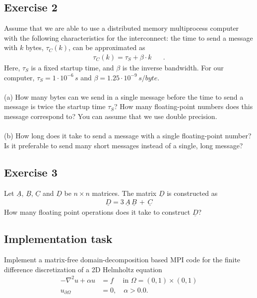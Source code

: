 \documentclass[11pt]{article}
\begin{document}
\clearpage
\subsection*{Exercise 2}

Assume that we are able to use a distributed memory multiprocess computer with the 
following characteristics for the interconnect: the time to send a
message with $k$ bytes, $\tau_C(k)$, can be approximated as 
\begin{eqnarray*}
\tau_C(k) = \tau_S + \beta \cdot k \,\,\,\,\,\,\,\,\,\, .
\end{eqnarray*}
Here, $\tau_S$ is a fixed startup time, and $\beta$ is the inverse bandwidth.
For our computer, $\tau_S = 1\cdot 10^{-6} \,s$ and $\beta = 1.25\cdot  10^{-9}\, s/byte$.\\
\\
(a) How many bytes can we send in a single message before the time to send a message 
is twice the startup time $\tau_S$? How many floating-point numbers does this 
message correspond to? You can assume that we use double precision.\\
\\
(b) How long does it take to send a message with a single floating-point number?
Is it preferable to send many short messages instead of a single, long message? 

\subsection*{Exercise 3}

Let $\underline{A}$, $\underline{B}$, $\underline{C}$ and $\underline{D}$ be $n\times n$ matrices. 
The matrix $\underline{D}$ is constructed as 
\begin{eqnarray*}
\underline{D} = 3\,\underline{A}\,\underline{B} \,+\, \underline{C}
\end{eqnarray*}
How many floating point operations does it take to construct $\underline{D}$?

\subsection*{Implementation task}
Implement a matrix-free domain-decomposition based MPI code for the finite difference
discretization of a 2D Helmholtz equation
\[
  \begin{split}
    -\nabla^2 u + \alpha u &= f \quad \text{ in } \Omega = (0,1)\times(0,1) \\
    u_{\partial\Omega} &= 0, \quad \alpha > 0.0.
  \end{split}
\]
\end{document}
